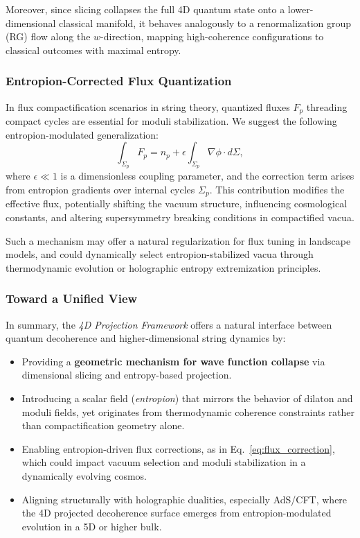 \documentclass[12pt]{article}
\begin{document}
Moreover, since slicing collapses the full 4D quantum state onto a lower-dimensional classical manifold, it behaves analogously to a renormalization group (RG) flow along the $w$-direction, mapping high-coherence configurations to classical outcomes with maximal entropy.

\subsubsection*{Entropion-Corrected Flux Quantization}

In flux compactification scenarios in string theory, quantized fluxes \( F_p \) threading compact cycles are essential for moduli stabilization. We suggest the following entropion-modulated generalization:
\begin{equation}
\int_{\Sigma_p} F_{p} = n_p + \epsilon \int_{\Sigma_p} \nabla \phi \cdot d\Sigma,
\label{eq:flux_correction}
\end{equation}
where \( \epsilon \ll 1 \) is a dimensionless coupling parameter, and the correction term arises from entropion gradients over internal cycles \( \Sigma_p \). This contribution modifies the effective flux, potentially shifting the vacuum structure, influencing cosmological constants, and altering supersymmetry breaking conditions in compactified vacua.

Such a mechanism may offer a natural regularization for flux tuning in landscape models, and could dynamically select entropion-stabilized vacua through thermodynamic evolution or holographic entropy extremization principles.

\subsubsection*{Toward a Unified View}

In summary, the \emph{4D Projection Framework} offers a natural interface between quantum decoherence and higher-dimensional string dynamics by:
\begin{itemize}
  \item Providing a \textbf{geometric mechanism for wave function collapse} via dimensional slicing and entropy-based projection.
  \item Introducing a scalar field (\emph{entropion}) that mirrors the behavior of dilaton and moduli fields, yet originates from thermodynamic coherence constraints rather than compactification geometry alone.
  \item Enabling entropion-driven flux corrections, as in Eq.~\eqref{eq:flux_correction}, which could impact vacuum selection and moduli stabilization in a dynamically evolving cosmos.
  \item Aligning structurally with holographic dualities, especially AdS/CFT, where the 4D projected decoherence surface emerges from entropion-modulated evolution in a 5D or higher bulk.
\end{itemize}
\end{document}

